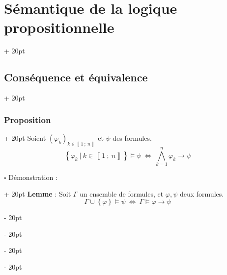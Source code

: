 \documentclass[a4paper, 12pt, twoside]{article}
\newcommand{\nset}[2]{\left\llbracket #1\ ;\ #2 \right\rrbracket}
\newcommand{\set}[1]{\left\{ #1 \right\}}
\newcommand{\ssi}{\ \Leftrightarrow \ }
\newcommand{\ind}[1][20pt]{\advance\leftskip + #1}
\newcommand{\deind}[1][20pt]{\advance\leftskip - #1}
\newenvironment{indt}[2][20pt]{#2 \par \ind[#1]}{\par \deind} %
\begin{document}
\begin{indt}{\section{Sémantique de la logique propositionnelle}}
\begin{indt}{\subsection{Conséquence et équivalence}}
            \vspace{12pt}
            
            \begin{indt}{\subsubsection{Proposition}}
                Soient $(\varphi_k)_{k \in \nset 1 n}$ et $\psi$ des formules.
                    \[ \set{\varphi_k\ |\ k \in \nset 1 n} \vDash \psi \ssi \bigwedge_{k = 1}^n \varphi_k \rightarrow \psi \]
                
                \begin{indt}{$\square$ Démonstration :}
                    \textbf{Lemme} : Soit $\Gamma$ un ensemble de formules, et $\varphi, \psi$ deux formules.
                        \[ \Gamma \cup \set \varphi \vDash \psi \ssi \Gamma \vDash \varphi \rightarrow \psi \]
                    

\end{indt}
\end{indt}
\end{indt}
\end{indt}
\end{document}
